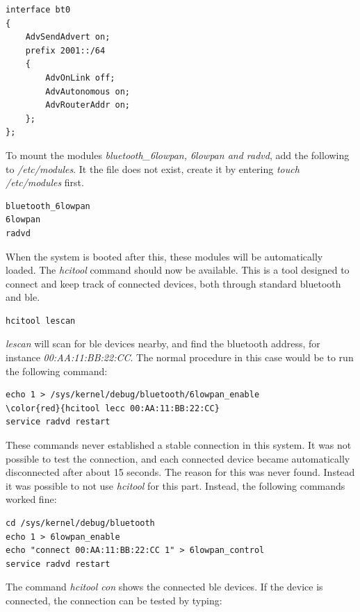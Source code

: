 \begin{verbatim}
interface bt0
{
    AdvSendAdvert on;
    prefix 2001::/64
    {
        AdvOnLink off;
        AdvAutonomous on;
        AdvRouterAddr on;
    };
};
\end{verbatim} 

\noindent To mount the modules \textit{bluetooth\_6lowpan, 6lowpan and radvd}, add the following to \textit{/etc/modules}. It the file does not exist, create it by entering \textit{touch /etc/modules} first. 

\begin{verbatim}
bluetooth_6lowpan
6lowpan
radvd
\end{verbatim}

\noindent When the system is booted after this, these modules will be automatically loaded. The \textit{hcitool} command should now be available. This is a tool designed to connect and keep track of connected devices, both through standard bluetooth and \gls{ble}. 

\begin{verbatim}
hcitool lescan
\end{verbatim}

\noindent \textit{lescan} will scan for \gls{ble} devices nearby, and find the bluetooth address, for instance \textit{00:AA:11:BB:22:CC}. The normal procedure in this case would be to run the following command: 

\begin{verbatim}
echo 1 > /sys/kernel/debug/bluetooth/6lowpan_enable
\color{red}{hcitool lecc 00:AA:11:BB:22:CC}
service radvd restart
\end{verbatim}

\noindent These commands never established a stable connection in this system. It was not possible to test the connection, and each connected device became automatically disconnected after about 15 seconds. The reason for this was never found. Instead it was possible to not use \textit{hcitool} for this part. Instead, the following commands worked fine:

\begin{verbatim}
cd /sys/kernel/debug/bluetooth
echo 1 > 6lowpan_enable
echo "connect 00:AA:11:BB:22:CC 1" > 6lowpan_control
service radvd restart
\end{verbatim} 

\noindent The command \textit{hcitool con} shows the connected \gls{ble} devices. If the device is connected, the connection can be tested by typing:

